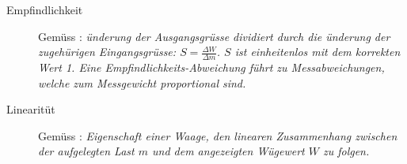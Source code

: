 \begin{description}
		\item[Empfindlichkeit]
		Gemüss \cite{waegelexikon}: \emph{ünderung der Ausgangsgrüsse dividiert durch die ünderung der zugehürigen Eingangsgrüsse: $S = \frac{\Delta W}{\Delta m}$. $S$ ist einheitenlos mit dem korrekten Wert 1. Eine Empfindlichkeits-Abweichung führt zu Messabweichungen, welche zum Messgewicht proportional sind.}
		
		\item[Linearitüt]
		Gemüss \cite{waegelexikon}: \emph{Eigenschaft einer Waage, den linearen Zusammenhang zwischen der aufgelegten Last $m$ und dem angezeigten Wügewert $W$ zu folgen.}
		
\end{description}
